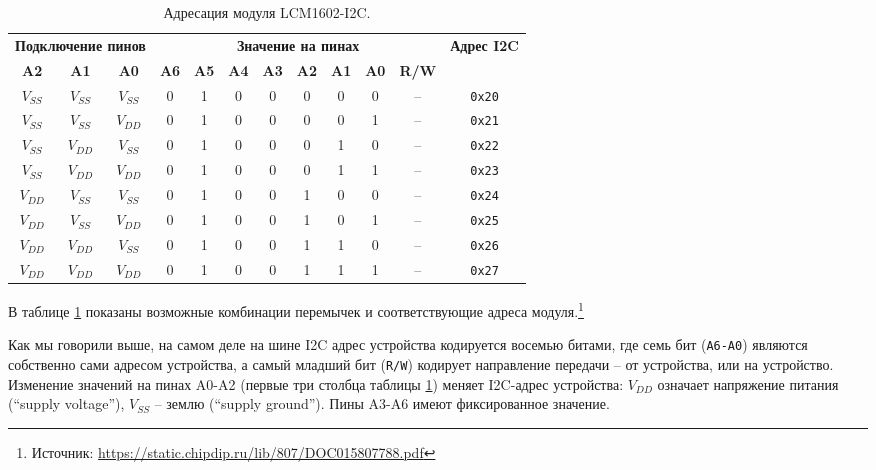 \documentclass[../sparc.tex]{subfiles}
\begin{document}
\begin{table}[H]
  \centering
  \begin{tabular}{
      | c | c | c
      | c | c | c | c | c | c | c
      | c
      | c
      | }
    \hline
    \multicolumn{3}{|c|}{\textbf{Подключение пинов}}
    & \multicolumn{8}{|c|}{\textbf{Значение на пинах}}
    & \multirow{2}{2em}{\textbf{Адрес I2C}} \\
    \textbf{A2}
    & \textbf{A1}
    & \textbf{A0}
    & \textbf{A6}
    & \textbf{A5}
    & \textbf{A4}
    & \textbf{A3}
    & \textbf{A2}
    & \textbf{A1}
    & \textbf{A0}
    & \textbf{R/W}
    &   \\
    \hline
    $V_{SS}$ & $V_{SS}$ & $V_{SS}$ & 0 & 1 & 0 & 0 & 0 & 0 & 0 & -- & \texttt{0x20} \\
    \hline
    $V_{SS}$ & $V_{SS}$ & $V_{DD}$ & 0 & 1 & 0 & 0 & 0 & 0 & 1 & -- & \texttt{0x21} \\
    \hline
    $V_{SS}$ & $V_{DD}$ & $V_{SS}$ & 0 & 1 & 0 & 0 & 0 & 1 & 0 & -- & \texttt{0x22} \\
    \hline
    $V_{SS}$ & $V_{DD}$ & $V_{DD}$ & 0 & 1 & 0 & 0 & 0 & 1 & 1 & -- & \texttt{0x23} \\
    \hline
    $V_{DD}$ & $V_{SS}$ & $V_{SS}$ & 0 & 1 & 0 & 0 & 1 & 0 & 0 & -- & \texttt{0x24} \\
    \hline
    $V_{DD}$ & $V_{SS}$ & $V_{DD}$ & 0 & 1 & 0 & 0 & 1 & 0 & 1 & -- & \texttt{0x25} \\
    \hline
    $V_{DD}$ & $V_{DD}$ & $V_{SS}$ & 0 & 1 & 0 & 0 & 1 & 1 & 0 & -- & \texttt{0x26} \\
    \hline
    $V_{DD}$ & $V_{DD}$ & $V_{DD}$ & 0 & 1 & 0 & 0 & 1 & 1 & 1 & -- & \texttt{0x27} \\
    \hline
  \end{tabular}
  \caption{Адресация модуля LCM1602-I2C.}
  \label{table:i2c-lcm1602-addressing}
\end{table}

В таблице \ref{table:i2c-lcm1602-addressing} показаны возможные комбинации
перемычек и соответствующие адреса модуля.\footnote{Источник:
\url{https://static.chipdip.ru/lib/807/DOC015807788.pdf}}

Как мы говорили выше, на самом деле на шине I2C адрес устройства кодируется
восемью битами, где семь бит (\texttt{A6-A0}) являются собственно сами адресом
устройства, а самый младший бит (\texttt{R/W}) кодирует направление передачи --
от устройства, или на устройство.  Изменение значений на пинах A0-A2 (первые три
столбца таблицы \ref{table:i2c-lcm1602-addressing}) меняет I2C-адрес устройства:
$V_{DD}$ означает напряжение питания (``supply voltage''), $V_{SS}$ -- землю
(``supply ground'').  Пины A3-A6 имеют фиксированное значение.
\end{document}
